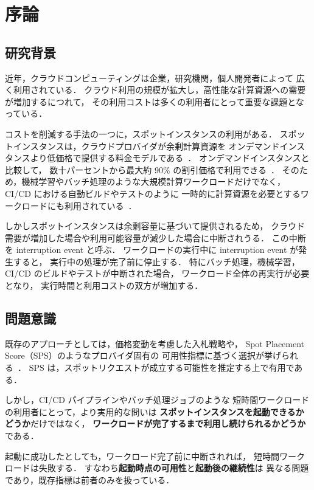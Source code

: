 \documentclass[11pt,a4paper]{ltjsreport}
\begin{document}
\chapter{序論}

\section{研究背景}

近年，クラウドコンピューティングは企業，研究機関，個人開発者によって
広く利用されている．
クラウド利用の規模が拡大し，高性能な計算資源への需要が増加するにつれて，
その利用コストは多くの利用者にとって重要な課題となっている．

コストを削減する手法の一つに，スポットインスタンスの利用がある．
スポットインスタンスは，クラウドプロバイダが余剰計算資源を
オンデマンドインスタンスより低価格で提供する料金モデルである~\cite{AWSSpot}．
オンデマンドインスタンスと比較して，
数十パーセントから最大約 90\% の割引価格で利用できる~\cite{Lin2022Survey}．
そのため，機械学習やバッチ処理のような大規模計算ワークロードだけでなく，
CI/CD における自動ビルドやテストのように
一時的に計算資源を必要とするワークロードにも利用されている~\cite{Ramesh2025}．

しかしスポットインスタンスは余剰容量に基づいて提供されるため，
クラウド需要が増加した場合や利用可能容量が減少した場合に中断されうる．
この中断を interruption event と呼ぶ．
ワークロードの実行中に interruption event が発生すると，
実行中の処理が完了前に停止する．
特にバッチ処理，機械学習，CI/CD のビルドやテストが中断された場合，
ワークロード全体の再実行が必要となり，
実行時間と利用コストの双方が増加する．

\section{問題意識}

既存のアプローチとしては，価格変動を考慮した入札戦略や，
Spot Placement Score（SPS）のようなプロバイダ固有の
可用性指標に基づく選択が挙げられる~\cite{Garg2025,Katayama2022}．
SPS は，スポットリクエストが成立する可能性を推定する上で有用である．

しかし，CI/CD パイプラインやバッチ処理ジョブのような
短時間ワークロードの利用者にとって，より実用的な問いは
\textbf{スポットインスタンスを起動できるかどうか}だけではなく，
\textbf{ワークロードが完了するまで利用し続けられるかどうか}である．

起動に成功したとしても，ワークロード完了前に中断されれば，
短時間ワークロードは失敗する．
すなわち\textbf{起動時点の可用性}と\textbf{起動後の継続性}は
異なる問題であり，既存指標は前者のみを扱っている．
\end{document}
